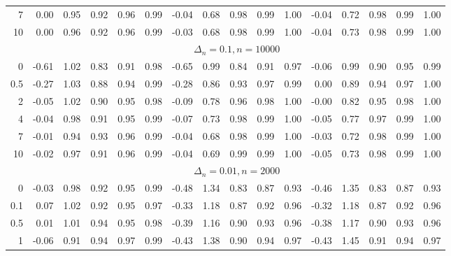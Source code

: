 \documentclass{article}
\theoremstyle{plain}
\theoremstyle{definition}
\theoremstyle{remark}
\begin{document}
\begin{appendix}
{\begin{table}[ht]
\begin{tabular}{r|rrrrr|rrrrr|rrrrr}
  7 & 0.00 & 0.95 & 0.92 & 0.96 & 0.99 & -0.04 & 0.68 & 0.98 & 0.99 & 1.00 & -0.04 & 0.72 & 0.98 & 0.99 & 1.00 \\ 
  10 & 0.00 & 0.96 & 0.92 & 0.96 & 0.99 & -0.03 & 0.68 & 0.98 & 0.99 & 1.00 & -0.04 & 0.73 & 0.98 & 0.99 & 1.00 \\ 
		\midrule
	&\multicolumn{15}{c}{$\Delta_n=0.1, n= 10000$}
	\\
0 & -0.61 & 1.02 & 0.83 & 0.91 & 0.98 & -0.65 & 0.99 & 0.84 & 0.91 & 0.97 & -0.06 & 0.99 & 0.90 & 0.95 & 0.99 \\ 
  0.5 & -0.27 & 1.03 & 0.88 & 0.94 & 0.99 & -0.28 & 0.86 & 0.93 & 0.97 & 0.99 & 0.00 & 0.89 & 0.94 & 0.97 & 1.00 \\ 
  2 & -0.05 & 1.02 & 0.90 & 0.95 & 0.98 & -0.09 & 0.78 & 0.96 & 0.98 & 1.00 & -0.00 & 0.82 & 0.95 & 0.98 & 1.00 \\ 
  4 & -0.04 & 0.98 & 0.91 & 0.95 & 0.99 & -0.07 & 0.73 & 0.98 & 0.99 & 1.00 & -0.05 & 0.77 & 0.97 & 0.99 & 1.00 \\ 
  7 & -0.01 & 0.94 & 0.93 & 0.96 & 0.99 & -0.04 & 0.68 & 0.98 & 0.99 & 1.00 & -0.03 & 0.72 & 0.98 & 0.99 & 1.00 \\ 
  10 & -0.02 & 0.97 & 0.91 & 0.96 & 0.99 & -0.04 & 0.69 & 0.99 & 0.99 & 1.00 & -0.05 & 0.73 & 0.98 & 0.99 & 1.00 \\ 
	\midrule
	\midrule
	&\multicolumn{15}{c}{$\Delta_n=0.01, n= 2000$}
	\\
0 & -0.03 & 0.98 & 0.92 & 0.95 & 0.99 & -0.48 & 1.34 & 0.83 & 0.87 & 0.93 & -0.46 & 1.35 & 0.83 & 0.87 & 0.93 \\ 
  0.1 & 0.07 & 1.02 & 0.92 & 0.95 & 0.97 & -0.33 & 1.18 & 0.87 & 0.92 & 0.96 & -0.32 & 1.18 & 0.87 & 0.92 & 0.96 \\ 
  0.5 & 0.01 & 1.01 & 0.94 & 0.95 & 0.98 & -0.39 & 1.16 & 0.90 & 0.93 & 0.96 & -0.38 & 1.17 & 0.90 & 0.93 & 0.96 \\ 
  1 & -0.06 & 0.91 & 0.94 & 0.97 & 0.99 & -0.43 & 1.38 & 0.90 & 0.94 & 0.97 & -0.43 & 1.45 & 0.91 & 0.94 & 0.97 \\ 

\end{tabular}
\end{table}}
\end{appendix}
\end{document}
